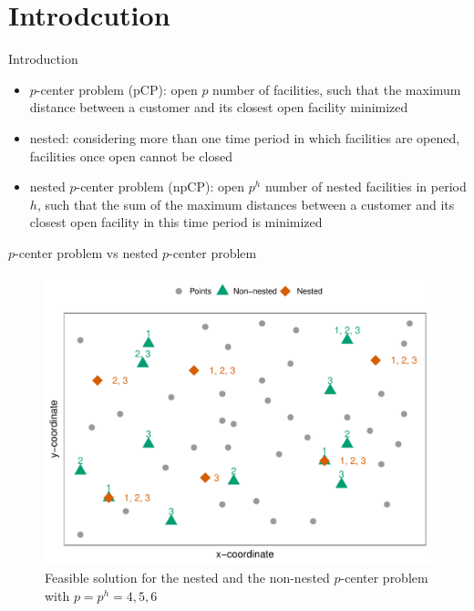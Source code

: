 \documentclass[utf8,aspectratio=169,ngerman,english]{beamer}
\renewcommand{\emph}[1]{\textcolor{jkuGreen}{#1}}
\newcommand{\npCP}{\emph{(npCP)}}
\newcommand{\pCP}{\emph{(pCP)}}
\begin{document}
\section*{Introdcution}
\begin{frame}{Introduction}
    \begin{itemize}
        \item \emph{$p$-center problem} \pCP: open $p$ number of facilities, such that the maximum distance between a customer and its closest open facility minimized \pause
        \item \emph{nested}: considering more than one time period in which facilities are opened, facilities once open cannot be closed \pause
        \item \emph{nested $p$-center problem} \npCP: open $p^h$ number of \emph{nested} facilities in period $h$, such that the sum of the maximum distances between a customer and its closest open facility in this time period is minimized
    \end{itemize}
\end{frame}

\begin{frame}{$p$-center problem vs nested $p$-center problem}
    \centering
    \vspace{-10pt}
    \begin{figure}
        \includegraphics[width=0.43\linewidth]{images/Rplot01.pdf}
        \caption{Feasible solution for the nested and the non-nested $p$-center problem with $p = p^h = 4, 5, 6$}
    \end{figure}
\end{frame}
\end{document}
